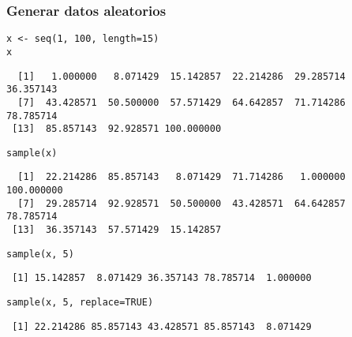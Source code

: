 \documentclass{beamer}
\begin{document}
\begin{frame}[fragile]
\frametitle{Generar datos aleatorios}
\label{sec-2-4}



\lstset{language=R}
\begin{lstlisting}
x <- seq(1, 100, length=15)
x
\end{lstlisting}

\begin{verbatim}
  [1]   1.000000   8.071429  15.142857  22.214286  29.285714  36.357143
  [7]  43.428571  50.500000  57.571429  64.642857  71.714286  78.785714
 [13]  85.857143  92.928571 100.000000
\end{verbatim}


\lstset{language=R}
\begin{lstlisting}
sample(x)
\end{lstlisting}

\begin{verbatim}
  [1]  22.214286  85.857143   8.071429  71.714286   1.000000 100.000000
  [7]  29.285714  92.928571  50.500000  43.428571  64.642857  78.785714
 [13]  36.357143  57.571429  15.142857
\end{verbatim}


\lstset{language=R}
\begin{lstlisting}
sample(x, 5)
\end{lstlisting}

\begin{verbatim}
 [1] 15.142857  8.071429 36.357143 78.785714  1.000000
\end{verbatim}


\lstset{language=R}
\begin{lstlisting}
sample(x, 5, replace=TRUE)
\end{lstlisting}

\begin{verbatim}
 [1] 22.214286 85.857143 43.428571 85.857143  8.071429
\end{verbatim}
\end{frame}
\end{document}
